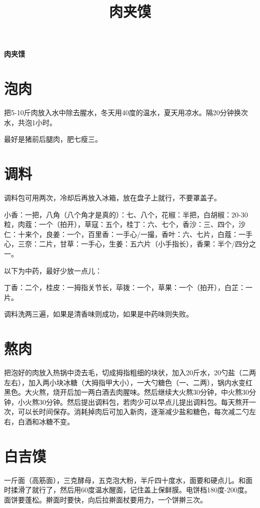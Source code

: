 \documentclass[unixfonts]{ltxdoc}
\title{肉夹馍}
\begin{document}
\begin{center}
  {\huge \textbf{肉夹馍}}
\end{center}
\section{泡肉}
把5-10斤肉放入水中除去腥水，冬天用40度的温水，夏天用凉水。隔20分钟换次水，共泡1小时。

最好是猪前后腿肉，肥七瘦三。
\section{调料}
调料包可用两次，冷却后再放入冰箱，放在盘子上就行，不要罩盖子。

小香：一把，八角（八个角才是真的）：七、八个，花椒：半把，白胡椒：20-30粒，肉蔻：一个（拍开），草寇：五个，桂丁：六、七个，香沙：三、四个，沙仁：十来个，良姜：一个，百里香：一手心/一撮，香叶：六、七片，白蔻：一手心，三奈：二片，甘草：一手心，生姜：五六片（小手指长），香果：半个/四分之一。

以下为中药，最好少放一点儿：


丁香：二个，桂皮：一拇指关节长，荜拨：一个，草果：一个（拍开），白芷：一片。


调料洗两三遍，如果是清香味则成功，如果是中药味则失败。
\section{熬肉}
把泡好的肉放入热锅中烫去毛，切成拇指粗细的块状，加入20斤水，20勺盐（二两左右），加入两小块冰糖（大拇指甲大小），一大勺糖色（一、二两），锅内水变红黑色。大火熬，烧开后加一两白酒去肉腥味。然后继续大火熬30分钟，中火熬30分钟，小火熬30分钟。然后提出调料包，若肉少可以早点儿提出调料包。每天熬开一次，可以长时间保存。消耗掉肉后可加入新肉，逐渐减少盐和糖色，每次减二勺左右，白酒和冰糖不变。

\section{白吉馍}
一斤面（高筋面），三克酵母，五克泡大粉，半斤四十度水，面要和硬点儿。和面时揉滑了就行了，然后用60度温水醒面，记住盖上保鲜膜。电饼档180度-200度。面饼要蓬松。擀面时要快，向后拉擀面杖要用力，一个饼擀三次。
\end{document}
